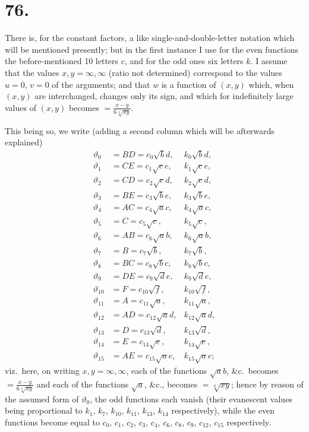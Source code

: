 \documentclass[11pt,a4paper]{article}
\newcommand{\uth}[1]{\vartheta_{#1}}
\begin{document}
\section*{76.}
\label{sec:76}

There is, for the constant factors, a like single-and-double-letter notation which will be mentioned presently; but in the first instance I use for the even functions the before-mentioned 10 letters $c$, and for the odd ones six letters $k$. I assume that the values $x,y = \infty, \infty$ (ratio not determined) correspond to the values $u=0$, $v=0$ of the arguments; and that $w$ is a function of $(x,y)$ which, when $(x,y)$ are interchanged, changes only its sign, and which for indefinitely large values of $(x,y)$ becomes $=\frac{x-y}{6\sqrt[4]{xy}}$.

This being so, we write (adding a second column which will be afterwards explained)
\begin{align*}
\uth{0} &= BD = c_0\surd bd, & k_0\surd bd, \\
\uth{1} &= CE = c_1\surd ce, & k_1\surd ce, \\
\uth{2} &= CD = c_2\surd cd, & k_2\surd cd, \\
\uth{3} &= BE = c_3\surd be, & k_3\surd be, \\
\uth{4} &= AC = c_4\surd ac, & k_4\surd ac, \\
\uth{5} &= C = c_5\surd c, & k_5\surd c, \\
\uth{6} &= AB = c_6\surd ab, & k_6\surd ab, \\
\uth{7} &= B = c_7\surd b, & k_7\surd b, \\
\uth{8} &= BC = c_8\surd bc, & k_8\surd bc, \\
\uth{9} &= DE = c_9\surd de, & k_9\surd de, \\
\uth{10} &= F = c_{10}\surd f, & k_{10}\surd f, \\
\uth{11} &= A = c_{11}\surd a, & k_{11}\surd a, \\
\uth{12} &= AD = c_{12}\surd ad, & k_{12}\surd ad, \\
\uth{13} &= D = c_{13}\surd d, & k_{13}\surd d, \\
\uth{14} &= E = c_{14}\surd e, & k_{14}\surd e, \\
\uth{15} &= AE = c_{15}\surd ae, & k_{15}\surd ae;
\end{align*}
viz.\ here, on writing $x,y = \infty, \infty$, each of the functions $\surd ab$, \&c.\ becomes $=\frac{x-y}{6\sqrt[4]{xy}}$ and each of the functions $\surd a$, \&c., becomes $=\sqrt[4]{xy}$; hence by reason of the assumed form of $\uth{0}$, the odd functions each vanish (their evanescent values being proportional to $k_1$, $k_7$, $k_{10}$, $k_{11}$, $k_{13}$, $k_{14}$ respectively), while the even functions become equal to $c_0$, $c_1$, $c_2$, $c_3$, $c_4$, $c_6$, $c_8$, $c_9$, $c_{12}$, $c_{15}$ respectively.
\end{document}
